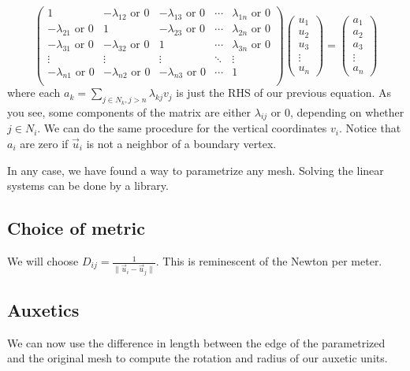 \documentclass{article}
\begin{document}
$$\begin{pmatrix}
  1 & -\lambda_{12} \text{ or 0} & -\lambda_{13} \text{ or 0} & \cdots & \lambda_{1n} \text{ or 0} \\
  -\lambda_{21} \text{ or 0} & 1 & -\lambda_{23} \text{ or 0} & \cdots & \lambda_{2n} \text{ or 0} \\
  -\lambda_{31} \text{ or 0} & -\lambda_{32} \text{ or 0} & 1 & \cdots & \lambda_{3n} \text{ or 0} \\
  \vdots & \vdots & \vdots & \ddots & \vdots \\
  -\lambda_{n1} \text{ or 0} & -\lambda_{n2} \text{ or 0} & -\lambda_{n3} \text{ or 0} & \cdots & 1\\
\end{pmatrix}
\begin{pmatrix}
  u_1 \\
  u_2 \\
  u_3 \\
  \vdots \\
  u_n
\end{pmatrix}
= \begin{pmatrix}
  a_1 \\
  a_2 \\
  a_3 \\
  \vdots \\
  a_n
\end{pmatrix}$$
where each $a_k = \sum_{j \in N_k, j > n} \lambda_{kj} v_j$ is just the RHS of our previous equation. As you see, some components of the matrix are either $\lambda_{ij}$ or $0$, depending on whether $j \in N_i$. We can do the same procedure for the vertical coordinates $v_i$. Notice that $a_i$ are zero if $\vec{u}_i$ is not a neighbor of a boundary vertex.

In any case, we have found a way to parametrize any mesh. \cite{meshparam} Solving the linear systems can be done by a library.

\subsection{Choice of metric}
We will choose $D_{ij} = \frac{1}{\lVert \vec{u}_i - \vec{u}_j \rVert}$. This is reminescent of the Newton per meter.

\subsection{Auxetics}
We can now use the difference in length between the edge of the parametrized and the original mesh to compute the rotation and radius of our auxetic units.
\end{document}
